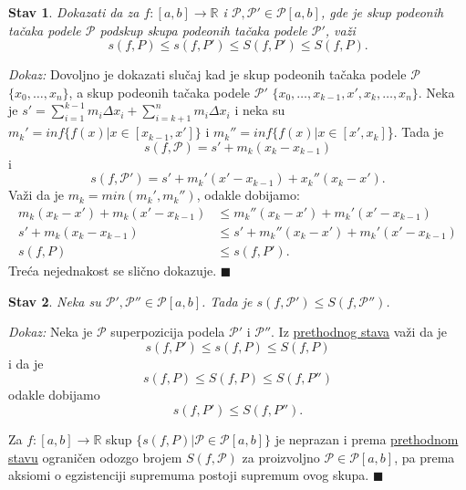 \documentclass{article}
\newtheorem{stav}{Stav}[section]
\begin{document}
\begin{stavbox}
    \begin{stav}
        \label{Stav_2.1}
        Dokazati da za $f: [a,b]\longrightarrow\mathbb{R}$ i
        $\mathcal{P},\mathcal{P'}\in \mathcal{P}[a,b]$, gde je skup podeonih tačaka podele $\mathcal{P}$ podskup
        skupa podeonih tačaka podele $\mathcal{P}'$, važi
        $$s(f,P)\leq s(f,P')\leq S(f,P')\leq S(f,P).$$
    \end{stav}
\end{stavbox}
\textit{Dokaz:} Dovoljno je dokazati slučaj kad je skup podeonih tačaka podele $\mathcal{P}$
$\{x_0,\dotsc,x_n\}$, a skup podeonih tačaka podele $\mathcal{P}'$
$\{x_0,\dotsc,x_{k-1},x',x_k,\dotsc,x_n\}$. Neka je $\displaystyle s'=\sum_{i=1}^{k-1}m_i\Delta x_i+\sum_{i=k+1}^{n}m_i\Delta x_i$ i neka su
$m_k'=inf\{f(x)\big|x\in[x_{k-1},x']\}$ i $m_k''=inf\{f(x)\big|x\in[x',x_k]$\}.
Tada je $$s(f,\mathcal{P})=s'+m_k(x_k-x_{k-1})$$
i
$$s(f,\mathcal{P}')=s'+m_k'(x'-x_{k-1})+x_k''(x_k-x').$$
Važi da je $m_k=min(m_k',m_k'')$, odakle dobijamo:
\begin{align*}
    m_k(x_k-x')+m_k(x'-x_{k-1}) & \leq m_k''(x_k-x')+m_k'(x'-x_{k-1})    \\
    s'+m_k(x_k-x_{k-1})         & \leq s'+m_k''(x_k-x')+m_k'(x'-x_{k-1}) \\
    s(f,P)                      & \leq s(f,P').
\end{align*}
Treća nejednakost se slično dokazuje.
\null\hfill $\blacksquare$\par

\begin{stavbox}
    \label{stav_2.2}
    \begin{stav}
        Neka su $\mathcal{P}',\mathcal{P}''\in\mathcal{P}[a,b]$. Tada je $s(f,\mathcal{P}')\leq S(f,\mathcal{P}'')$.
    \end{stav}

\end{stavbox}\textit{Dokaz:} Neka je $\mathcal{P}$ superpozicija podela $\mathcal{P}'$ i $\mathcal{P}''$. Iz
\hyperref[Stav_2.1]{prethodnog stava} važi da je
$$s(f,P')\leq s(f,P)\leq S(f,P)$$
i da je
$$s(f,P)\leq S(f,P)\leq S(f,P'')$$
odakle dobijamo
$$s(f,P')\leq S(f,P'').$$

Za $f: [a,b]\longrightarrow\mathbb{R}$ skup $\{s(f,P)\big|\mathcal{P}\in\mathcal{P}[a,b]\}$
je neprazan i prema \hyperref[stav_2.2]{prethodnom stavu} ograničen odozgo brojem $S(f,\mathcal{P})$ za proizvoljno $\mathcal{P}\in\mathcal{P}[a,b]$,
pa prema aksiomi o egzistenciji supremuma postoji supremum ovog
skupa.
\null\hfill $\blacksquare$\par
\end{document}
